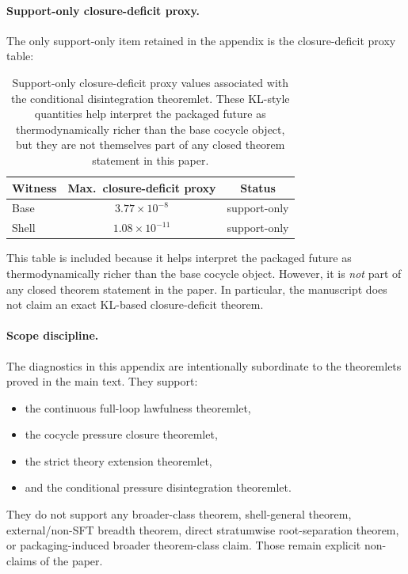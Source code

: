 \documentclass[11pt]{article}
\theoremstyle{definition}
\begin{document}
\paragraph{Support-only closure-deficit proxy.}
The only support-only item retained in the appendix is the closure-deficit proxy table:
\begin{table}[t]
\caption{Support-only closure-deficit proxy values associated with the conditional
disintegration theoremlet.
These KL-style quantities help interpret the packaged future as
thermodynamically richer than the base cocycle object, but they are
not themselves part of any closed theorem statement in this paper.}
\label{tbl:closure-deficit-proxy}
\centering
\small
\begin{tabular}{@{}l c c@{}}
\toprule
Witness & Max.\ closure-deficit proxy & Status \\
\midrule
Base  & $3.77\times 10^{-8}$  & support-only \\
Shell & $1.08\times 10^{-11}$ & support-only \\
\bottomrule
\end{tabular}
\end{table}
 This table is included because it helps interpret the packaged future as thermodynamically richer than the base cocycle object. However, it is \emph{not} part of any closed theorem statement in the paper. In particular, the manuscript does not claim an exact KL-based closure-deficit theorem.

\paragraph{Scope discipline.}
The diagnostics in this appendix are intentionally subordinate to the theoremlets proved in the main text. They support:
\begin{itemize}
    \item the continuous full-loop lawfulness theoremlet,
    \item the cocycle pressure closure theoremlet,
    \item the strict theory extension theoremlet,
    \item and the conditional pressure disintegration theoremlet.
\end{itemize}
They do not support any broader-class theorem, shell-general theorem, external/non-SFT breadth theorem, direct stratumwise root-separation theorem, or packaging-induced broader theorem-class claim. Those remain explicit non-claims of the paper.
 


\end{document}
